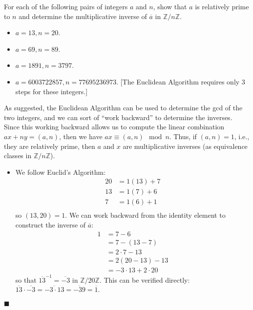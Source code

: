 \documentclass[12pt]{article}
\renewcommand{\qed}{\hfill$\blacksquare$}
\renewenvironment{proof}{\begin{addmargin}[1em]{0em}\begin{newproof}}{\end{newproof}\end{addmargin}\qed}
\newenvironment{problem}[2][Exercise]{\begin{trivlist}
\item[\hskip \labelsep {\bfseries #1}\hskip \labelsep {\bfseries #2.}]}{\end{trivlist}}
\begin{document}
\begin{problem}{0.3.15}
For each of the following pairs of integers $a$ and $n$, show that $a$ is relatively prime to $n$ and determine the multiplicative inverse of $\overline{a}$ in $\mathbb{Z}/n\mathbb{Z}$.
\begin{itemize}
    \item $a=13,n=20$.
    \item $a=69,n=89$.
    \item $a=1891,n=3797$.
    \item $a=6003722857,n=77695236973$. [The Euclidean Algorithm requires only $3$ steps for these integers.]
\end{itemize}
\end{problem}
\begin{proof}
As suggested, the Euclidean Algorithm can be used to determine the gcd of the two integers, and we can sort of ``work backward'' to determine the inverses. Since this working backward allows us to compute the linear combination $ax + ny = \left(a,n\right)$, then we have $ax \equiv \left(a,n\right) \mod n$. Thus, if $\left(a,n\right)=1$, i.e., they are relatively prime, then $a$ and $x$ are multiplicative inverses (as equivalence classes in $\mathbb{Z}/n\mathbb{Z}$).
\begin{itemize}
	\item We follow Euclid's Algorithm:
	\begin{equation*}
		\begin{split}
			20  & = 1\left(13\right) + 7 \\
			13 & = 1\left(7\right) + 6 \\
			7 & = 1\left(6\right) + 1 \\ 
		\end{split}
	\end{equation*}
	so $\left(13,20\right)=1$. We can work backward from the identity element to construct the inverse of $\overline{a}$:
	\begin{equation*}
		\begin{split}
			1 & = 7 -6 \\
			& = 7 - \left(13 - 7\right) \\
			& = 2\cdot 7 - 13 \\
			& = 2\left(20 - 13\right) - 13 \\
			& = -3 \cdot 13 + 2\cdot 20
		\end{split}
	\end{equation*} so that $\overline{13}^{-1} = \overline{-3}$ in $\mathbb{Z}/20\mathbb{Z}$. This can be verified directly: $\overline{13}\cdot \overline{-3} = \overline{-3\cdot 13} = \overline{-39} = \overline{1}$.
	

\end{itemize}
\end{proof}
\end{document}

